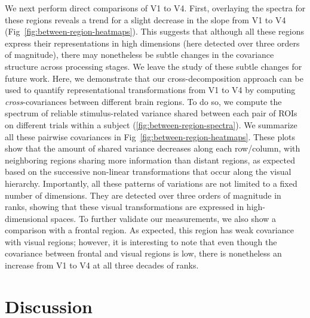 \documentclass[10pt]{article}
\begin{document}
We next perform direct comparisons of V1 to V4. First, overlaying the spectra for these regions reveals a trend for a slight decrease in the slope from V1 to V4 (Fig~\ref{fig:between-region-heatmaps}). This suggests that although all these regions express their representations in high dimensions (here detected over three orders of magnitude), there may nonetheless be subtle changes in the covariance structure across processing stages. We leave the study of these subtle changes for future work. Here, we demonstrate that our cross-decomposition approach can be used to quantify representational transformations from V1 to V4 by computing \emph{cross}-covariances between different brain regions. To do so, we compute the spectrum of reliable stimulus-related variance shared between each pair of ROIs on different trials within a subject (\ref{fig:between-region-spectra}). We summarize all these pairwise covariances in Fig~\ref{fig:between-region-heatmaps}. These plots show that the amount of shared variance decreases along each row/column, with neighboring regions sharing more information than distant regions, as expected based on the successive non-linear transformations that occur along the visual hierarchy. Importantly, all these patterns of variations are not limited to a fixed number of dimensions. They are detected over three orders of magnitude in ranks, showing that these visual transformations are expressed in high-dimensional spaces. To further validate our measurements, we also show a comparison with a frontal region. As expected, this region has weak covariance with visual regions; however, it is interesting to note that even though the covariance between frontal and visual regions is low, there is nonetheless an increase from V1 to V4 at all three decades of ranks.

\section{Discussion}\label{discussion}
\end{document}
